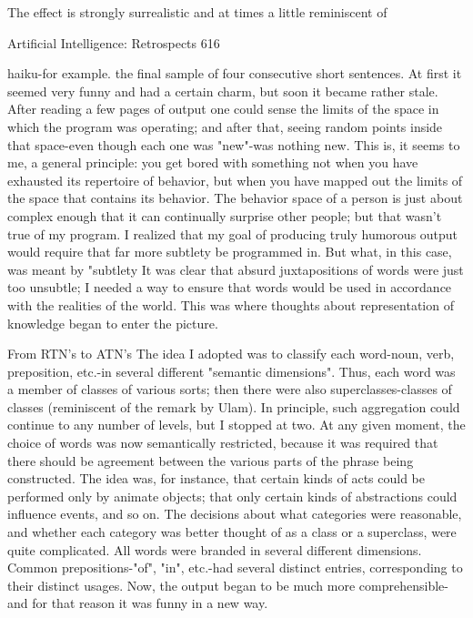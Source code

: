 {The effect is strongly surrealistic and at times a little reminiscent of




Artificial Intelligence: Retrospects                                                   616

haiku-for example. the final sample of four consecutive short sentences. At first it seemed
very funny and had a certain charm, but soon it became rather stale. After reading a few
pages of output one could sense the limits of the space in which the program was
operating; and after that, seeing random points inside that space-even though each one
was "new"-was nothing new. This is, it seems to me, a general principle: you get bored
with something not when you have exhausted its repertoire of behavior, but when you
have mapped out the limits of the space that contains its behavior. The behavior space of
a person is just about complex enough that it can continually surprise other people; but
that wasn't true of my program. I realized that my goal of producing truly humorous
output would require that far more subtlety be programmed in. But what, in this case, was
meant by "subtlety It was clear that absurd juxtapositions of words were just too
unsubtle; I needed a way to ensure that words would be used in accordance with the
realities of the world. This was where thoughts about representation of knowledge began
to enter the picture.

                                From RTN's to ATN's
The idea I adopted was to classify each word-noun, verb, preposition, etc.-in several
different "semantic dimensions". Thus, each word was a member of classes of various
sorts; then there were also superclasses-classes of classes (reminiscent of the remark by
Ulam). In principle, such aggregation could continue to any number of levels, but I
stopped at two. At any given moment, the choice of words was now semantically
restricted, because it was required that there should be agreement between the various
parts of the phrase being constructed. The idea was, for instance, that certain kinds of acts
could be performed only by animate objects; that only certain kinds of abstractions could
influence events, and so on. The decisions about what categories were reasonable, and
whether each category was better thought of as a class or a superclass, were quite
complicated. All words were branded in several different dimensions. Common
prepositions-"of", "in", etc.-had several distinct entries, corresponding to their distinct
usages. Now, the output began to be much more comprehensible-and for that reason it
was funny in a new way.

}

